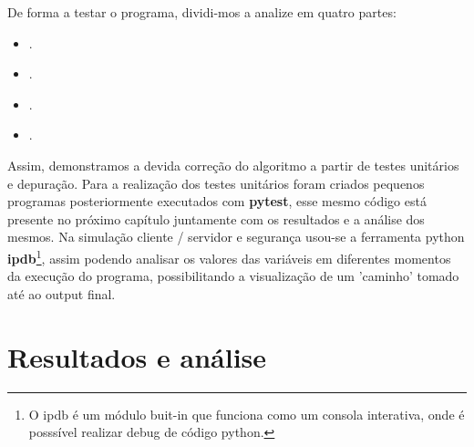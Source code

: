 \documentclass{report}
\theoremstyle{remark}
\begin{document}
De forma a testar o programa, dividi-mos a analize em quatro partes: 
\begin{itemize}
  \item {}.
  \item {}.
  \item {}.
  \item {}.
\end{itemize}

Assim, demonstramos a devida correção do algoritmo a partir de testes unitários e depuração. Para a realização dos testes unitários foram criados pequenos programas posteriormente executados com \textbf{pytest}, esse mesmo código está presente no próximo capítulo juntamente com os resultados e a análise dos mesmos. Na simulação cliente / servidor e segurança usou-se a ferramenta python \textbf{\ac{ipdb}}\footnote{O ipdb é um módulo buit-in que funciona como um consola interativa, onde é posssível realizar debug de código python.}, assim podendo analisar os valores das variáveis em diferentes momentos da execução do programa, possibilitando a visualização de um 'caminho' tomado até ao output final.



%
%
%
%
%
%

\chapter{Resultados e análise}
\label{chap.resultados e análise}
\end{document}
